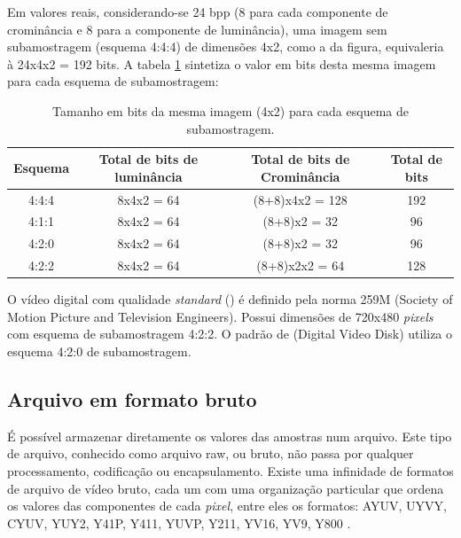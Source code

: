Em valores reais, considerando-se 24 bpp (8 para cada componente de crominância e 8 para a componente de luminância), uma imagem sem subamostragem (esquema 4:4:4) de dimensões 4x2, como a da figura, equivaleria à 24x4x2 = 192 bits. A tabela \ref{tab:subsampling}  sintetiza o valor em bits desta mesma imagem para cada esquema de subamostragem:

\begin{table}[!h]
	\centering
	\caption[Tamanho em bits para cada subamostragem]{Tamanho em bits da mesma imagem (4x2) para cada esquema de subamostragem.}
	\label{tab:subsampling}
	\begin{tabular}{|c|c|c|c|}
		\hline
		Esquema & Total de bits de luminância & Total de bits de Crominância & Total de bits \\
	    \hline
		4:4:4 & 8x4x2 = 64 & (8+8)x4x2 = 128 & 192 \\
	    \hline
		4:1:1 & 8x4x2 = 64 & (8+8)x2 = 32 & 96 \\
	    \hline
		4:2:0 & 8x4x2 = 64 & (8+8)x2 = 32 & 96 \\
	    \hline
		4:2:2 & 8x4x2 = 64 & (8+8)x2x2 = 64 & 128 \\
		\hline
	\end{tabular}
\end{table}

O vídeo digital com qualidade \emph{standard} () é definido pela norma  259M (Society of Motion Picture and Television Engineers). Possui dimensões de 720x480 \emph{pixels} com esquema de subamostragem 4:2:2. O padrão de  (Digital Video Disk) utiliza o esquema 4:2:0 de subamostragem.

\subsection{Arquivo em formato bruto}

É possível armazenar diretamente os valores das amostras num arquivo. Este tipo de arquivo, conhecido como arquivo raw, ou bruto, não passa por qualquer processamento, codificação ou encapsulamento. Existe uma infinidade de formatos de arquivo de vídeo bruto, cada um com uma organização particular que ordena os valores das componentes de cada \emph{pixel}, entre eles os formatos: AYUV, UYVY, CYUV, YUY2, Y41P, Y411, YUVP, Y211, YV16, YV9, Y800 \cite{fourccyuv}. %

